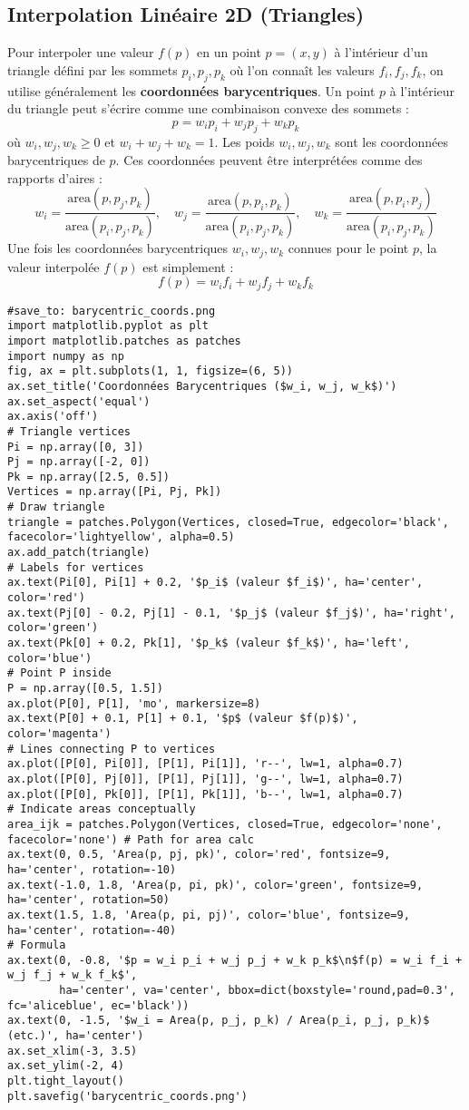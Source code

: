 \subsection{Interpolation Linéaire 2D (Triangles)}
Pour interpoler une valeur \(f(p)\) en un point \(p=(x,y)\) à l'intérieur d'un triangle défini par les sommets \(p_i, p_j, p_k\) où l'on connaît les valeurs \(f_i, f_j, f_k\), on utilise généralement les \textbf{coordonnées barycentriques}.
Un point \(p\) à l'intérieur du triangle peut s'écrire comme une combinaison convexe des sommets :
\[ p = w_i p_i + w_j p_j + w_k p_k \]
où \(w_i, w_j, w_k \ge 0\) et \(w_i + w_j + w_k = 1\). Les poids \(w_i, w_j, w_k\) sont les coordonnées barycentriques de \(p\).
Ces coordonnées peuvent être interprétées comme des rapports d'aires :
\[ w_i = \frac{\text{area}(p, p_j, p_k)}{\text{area}(p_i, p_j, p_k)}, \quad w_j = \frac{\text{area}(p, p_i, p_k)}{\text{area}(p_i, p_j, p_k)}, \quad w_k = \frac{\text{area}(p, p_i, p_j)}{\text{area}(p_i, p_j, p_k)} \]
Une fois les coordonnées barycentriques \(w_i, w_j, w_k\) connues pour le point \(p\), la valeur interpolée \(f(p)\) est simplement :
\[ f(p) = w_i f_i + w_j f_j + w_k f_k \]
\begin{verbatim}
#save_to: barycentric_coords.png
import matplotlib.pyplot as plt
import matplotlib.patches as patches
import numpy as np
fig, ax = plt.subplots(1, 1, figsize=(6, 5))
ax.set_title('Coordonnées Barycentriques ($w_i, w_j, w_k$)')
ax.set_aspect('equal')
ax.axis('off')
# Triangle vertices
Pi = np.array([0, 3])
Pj = np.array([-2, 0])
Pk = np.array([2.5, 0.5])
Vertices = np.array([Pi, Pj, Pk])
# Draw triangle
triangle = patches.Polygon(Vertices, closed=True, edgecolor='black', facecolor='lightyellow', alpha=0.5)
ax.add_patch(triangle)
# Labels for vertices
ax.text(Pi[0], Pi[1] + 0.2, '$p_i$ (valeur $f_i$)', ha='center', color='red')
ax.text(Pj[0] - 0.2, Pj[1] - 0.1, '$p_j$ (valeur $f_j$)', ha='right', color='green')
ax.text(Pk[0] + 0.2, Pk[1], '$p_k$ (valeur $f_k$)', ha='left', color='blue')
# Point P inside
P = np.array([0.5, 1.5])
ax.plot(P[0], P[1], 'mo', markersize=8)
ax.text(P[0] + 0.1, P[1] + 0.1, '$p$ (valeur $f(p)$)', color='magenta')
# Lines connecting P to vertices
ax.plot([P[0], Pi[0]], [P[1], Pi[1]], 'r--', lw=1, alpha=0.7)
ax.plot([P[0], Pj[0]], [P[1], Pj[1]], 'g--', lw=1, alpha=0.7)
ax.plot([P[0], Pk[0]], [P[1], Pk[1]], 'b--', lw=1, alpha=0.7)
# Indicate areas conceptually
area_ijk = patches.Polygon(Vertices, closed=True, edgecolor='none', facecolor='none') # Path for area calc
ax.text(0, 0.5, 'Area(p, pj, pk)', color='red', fontsize=9, ha='center', rotation=-10)
ax.text(-1.0, 1.8, 'Area(p, pi, pk)', color='green', fontsize=9, ha='center', rotation=50)
ax.text(1.5, 1.8, 'Area(p, pi, pj)', color='blue', fontsize=9, ha='center', rotation=-40)
# Formula
ax.text(0, -0.8, '$p = w_i p_i + w_j p_j + w_k p_k$\n$f(p) = w_i f_i + w_j f_j + w_k f_k$',
        ha='center', va='center', bbox=dict(boxstyle='round,pad=0.3', fc='aliceblue', ec='black'))
ax.text(0, -1.5, '$w_i = Area(p, p_j, p_k) / Area(p_i, p_j, p_k)$ (etc.)', ha='center')
ax.set_xlim(-3, 3.5)
ax.set_ylim(-2, 4)
plt.tight_layout()
plt.savefig('barycentric_coords.png')
\end{verbatim}
